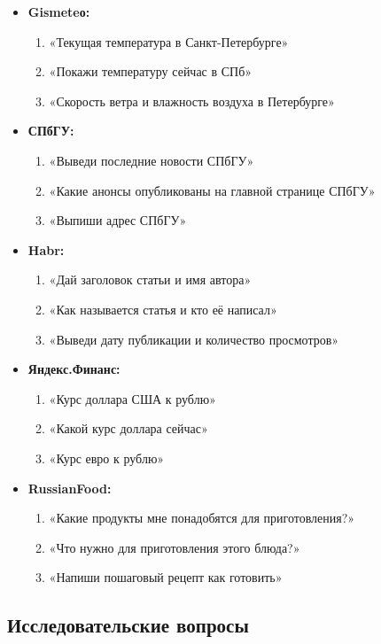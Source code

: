 \begin{itemize}
    \item \textbf{Gismeteо:}
    \begin{enumerate}
        \item «Текущая температура в Санкт-Петербурге»
        \item «Покажи температуру сейчас в СПб»
        \item «Скорость ветра и влажность воздуха в Петербурге»
    \end{enumerate}
    \item \textbf{СПбГУ:}
    \begin{enumerate}
        \item «Выведи последние новости СПбГУ»
        \item «Какие анонсы опубликованы на главной странице СПбГУ»
        \item «Выпиши адрес СПбГУ»
    \end{enumerate}
    \item \textbf{Habr:}
    \begin{enumerate}
        \item «Дай заголовок статьи и имя автора»
        \item «Как называется статья и кто её написал»
        \item «Выведи дату публикации и количество просмотров»
    \end{enumerate}
    \item \textbf{Яндекс.Финанс:}
    \begin{enumerate}
        \item «Курс доллара США к рублю»
        \item «Какой курс доллара сейчас»
        \item «Курс евро к рублю»
    \end{enumerate}
    \item \textbf{RussianFood:}
    \begin{enumerate}
        \item «Какие продукты мне понадобятся для приготовления?»
        \item «Что нужно для приготовления этого блюда?»
        \item «Напиши пошаговый рецепт как готовить»
    \end{enumerate}
\end{itemize}

\subsection{Исследовательские вопросы}

